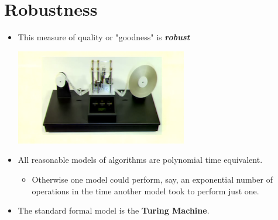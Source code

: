 \documentclass[12pt]{article}
\begin{document}
\section{Robustness}
\renewcommand{\labelitemii}{$\circ$}
\renewcommand{\labelitemiii}{$\cdot$}
\renewcommand{\labelitemiii}{$\rightarrow$}
\renewcommand{\labelitemiv}{$\star$}
\begin{itemize}
\item This measure of quality or "goodness" is \textbf{\textit{robust}}
	\begin{center}
	\includegraphics{lecture1d}
	\end{center}
\item All reasonable models of algorithms are polynomial time equivalent.
	\begin{itemize}
	\item Otherwise one model could perform, say, an exponential number of operations in the time another model took to perform just one.
	\end{itemize}
\item The standard formal model is the \textbf{Turing Machine}.
\end{itemize}
\end{document}
